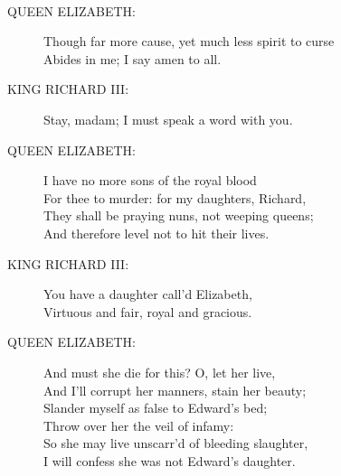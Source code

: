 \documentclass{article}
\begin{document}
\centering{\it [Exit]}\\
\begin{description}
\item[QUEEN ELIZABETH:] 
\hspace{1pt}Though far more cause, yet much less spirit to curse\\
\hspace{1pt}Abides in me; I say amen to all.\\
\end{description}
\begin{description}
\item[KING RICHARD III:] 
\hspace{1pt}Stay, madam; I must speak a word with you.\\
\end{description}
\begin{description}
\item[QUEEN ELIZABETH:] 
\hspace{1pt}I have no more sons of the royal blood\\
\hspace{1pt}For thee to murder: for my daughters, Richard,\\
\hspace{1pt}They shall be praying nuns, not weeping queens;\\
\hspace{1pt}And therefore level not to hit their lives.\\
\end{description}
\begin{description}
\item[KING RICHARD III:] 
\hspace{1pt}You have a daughter call'd Elizabeth,\\
\hspace{1pt}Virtuous and fair, royal and gracious.\\
\end{description}
\begin{description}
\item[QUEEN ELIZABETH:] 
\hspace{1pt}And must she die for this? O, let her live,\\
\hspace{1pt}And I'll corrupt her manners, stain her beauty;\\
\hspace{1pt}Slander myself as false to Edward's bed;\\
\hspace{1pt}Throw over her the veil of infamy:\\
\hspace{1pt}So she may live unscarr'd of bleeding slaughter,\\
\hspace{1pt}I will confess she was not Edward's daughter.\\
\end{description}
\end{document}
